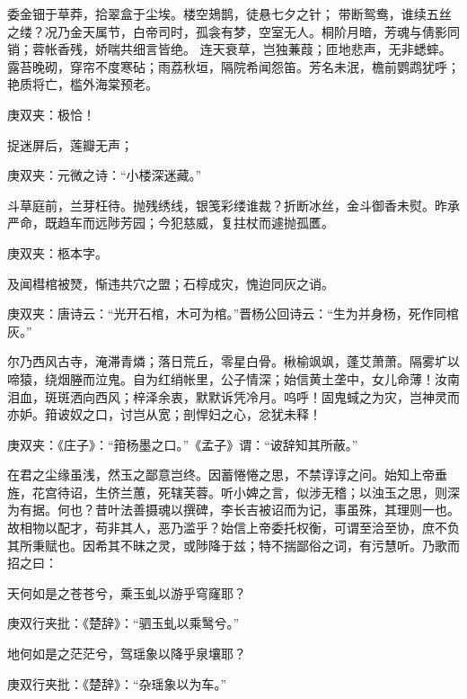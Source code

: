 \begin{qute2sp}
\begin{parag}
        委金钿于草莽，拾翠盒于尘埃。楼空鳷鹊，徒悬七夕之针；
        带断鸳鸯，谁续五丝之缕？况乃金天属节，白帝司时，孤衾有梦，空室无人。桐阶月暗，芳魂与倩影同销；蓉帐香残，娇喘共细言皆绝。
        连天衰草，岂独蒹葭；匝地悲声，无非蟋蟀。
        露苔晚砌，穿帘不度寒砧；雨荔秋垣，隔院希闻怨笛。芳名未泯，檐前鹦鹉犹呼；艳质将亡，槛外海棠预老。
        \begin{note}庚双夹：极恰！\end{note}
        捉迷屏后，莲瓣无声；
        \begin{note}庚双夹：元微之诗：“小楼深迷藏。”\end{note}
        斗草庭前，兰芽枉待。抛残绣线，银笺彩缕谁裁？折断冰丝，金斗御香未熨。昨承严命，既趋车而远陟芳园；今犯慈威，复拄杖而遽抛孤匶。\begin{note}庚双夹：柩本字。
        \end{note}及闻槥棺被燹，惭违共穴之盟；石椁成灾，愧迨同灰之诮。
        \begin{note}庚双夹：唐诗云：“光开石棺，木可为棺。”晋杨公回诗云：“生为并身杨，死作同棺灰。”\end{note}
        尔乃西风古寺，淹滞青燐；落日荒丘，零星白骨。楸榆飒飒，蓬艾萧萧。隔雾圹以啼猿，绕烟塍而泣鬼。自为红绡帐里，公子情深；始信黄土垄中，女儿命薄！汝南泪血，斑斑洒向西风；梓泽余衷，默默诉凭冷月。呜呼！固鬼蜮之为灾，岂神灵而亦妒。箝诐奴之口，讨岂从宽；剖悍妇之心，忿犹未释！
        \begin{note}庚双夹：《庄子》：“箝杨墨之口。”《孟子》谓：“诐辞知其所蔽。”\end{note}
        在君之尘缘虽浅，然玉之鄙意岂终。因蓄惓惓之思，不禁谆谆之问。始知上帝垂旌，花宫待诏，生侪兰蕙，死辖芙蓉。听小婢之言，似涉无稽；以浊玉之思，则深为有据。何也？昔叶法善摄魂以撰碑，李长吉被诏而为记，事虽殊，其理则一也。故相物以配才，苟非其人，恶乃滥乎？始信上帝委托权衡，可谓至洽至协，庶不负其所秉赋也。因希其不昧之灵，或陟降于兹；特不揣鄙俗之词，有污慧听。乃歌而招之曰：
    \end{parag}


    \begin{poem}
        \begin{pl}天何如是之苍苍兮，乘玉虬以游乎穹窿耶？\end{pl}
        \begin{note}庚双行夹批：《楚辞》：“驷玉虬以乘鹥兮。”\end{note}

        \begin{pl}地何如是之茫茫兮，驾瑶象以降乎泉壤耶？\end{pl}
        \begin{note}庚双行夹批：《楚辞》：“杂瑶象以为车。”\end{note}


\end{poem}
\end{qute2sp}
